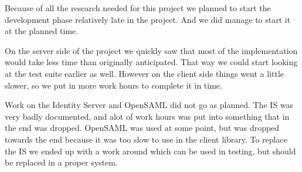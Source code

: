 
Because of all the research needed for this project we planned to start the development phase relatively late in the project. And we did manage to start it at the planned time.

On the server side of the project we quickly saw that most of the implementation would take less time than originally anticipated. That way we could start looking at the test suite earlier as well. However on the client side things went a little slower, so we put in more work hours to complete it in time. 

Work on the Identity Server and OpenSAML did not go as planned. The IS was very badly documented, and alot of work hours was put into something that in the end was dropped. OpenSAML was used at some point, but was dropped towards the end because it was too slow to use in the client library. To replace the IS we ended up with a work around which can be used in testing, but should be replaced in a proper system.
